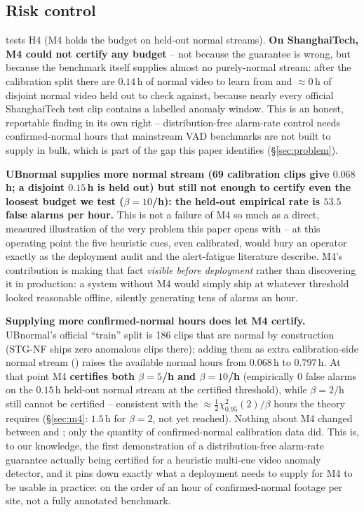 \documentclass[conference]{IEEEtran}
\begin{document}
\subsection{Risk control}

 tests H4 (M4 holds the budget on held-out normal streams).
\textbf{On ShanghaiTech, M4 could not certify any budget} -- not because the
guarantee is wrong, but because the benchmark itself supplies almost no
purely-normal stream: after the calibration split there are $0.14$\,h of
normal video to learn from and $\approx 0$\,h of disjoint normal video held
out to check against, because nearly every official ShanghaiTech test clip
contains a labelled anomaly window. This is an honest, reportable finding in
its own right -- distribution-free alarm-rate control needs confirmed-normal
hours that mainstream VAD benchmarks are not built to supply in bulk, which is
part of the gap this paper identifies (\S\ref{sec:problem}).

\textbf{UBnormal supplies more normal stream (69 calibration clips give
$0.068$\,h; a disjoint $0.15$\,h is held out) but still not enough to certify
even the loosest budget we test ($\beta{=}10$/h): the held-out empirical rate
is $53.5$ false alarms per hour.} This is not a failure of M4 so much as a
direct, measured illustration of the very problem this paper opens with -- at
this operating point the five heuristic cues, even calibrated, would bury an
operator exactly as the deployment audit \cite{benchmarkauc2026} and the
alert-fatigue literature \cite{alertfatigue2025} describe. M4's contribution is making that fact
\emph{visible before deployment} rather than discovering it in production: a
system without M4 would simply ship at whatever threshold looked reasonable
offline, silently generating tens of alarms an hour.

\textbf{Supplying more confirmed-normal hours does let M4 certify.}
UBnormal's official ``train'' split is 186 clips that are normal by
construction (STG-NF ships zero anomalous clips there); adding them as extra
calibration-side normal stream () raises the available normal
hours from $0.068$\,h to $0.797$\,h. At that point M4 \textbf{certifies both
$\beta{=}5$/h and $\beta{=}10$/h} (empirically $0$ false alarms on the
$0.15$\,h held-out normal stream at the certified threshold), while
$\beta{=}2$/h still cannot be certified -- consistent with the
$\approx\tfrac12\chi^2_{0.95}(2)/\beta$ hours the theory requires
(\S\ref{sec:m4}: $1.5$\,h for $\beta{=}2$, not yet reached). Nothing about M4
changed between  and ; only the quantity of
confirmed-normal calibration data did. This is, to our knowledge, the first
demonstration of a distribution-free alarm-rate guarantee actually being
certified for a heuristic multi-cue video anomaly detector, and it pins down
exactly what a deployment needs to supply for M4 to be usable in practice: on
the order of an hour of confirmed-normal footage per site, not a fully
annotated benchmark.

\end{document}
